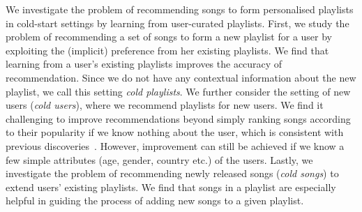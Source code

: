 %
We investigate the problem of recommending songs to form personalised playlists %
in cold-start settings by learning from user-curated playlists.
%
%
First, we study the problem of recommending a set of songs to form a new playlist for a user
by exploiting the (implicit) preference %
from her existing playlists.
We find that learning from a user's existing playlists %
improves the accuracy of recommendation.
Since we do not have any contextual information about the new playlist, 
we call this setting \emph{cold playlists}.
%
We further consider the setting of new users (\ie \emph{cold users}),
where we recommend playlists for new users.
We find it challenging to improve recommendations beyond simply ranking songs according to their popularity 
if we know nothing about the user, which is consistent with previous 
discoveries~\cite{mcfee2012million,bonnin2013evaluating,bonnin2015automated}.
However, improvement can still be achieved if we know a few simple attributes (\eg age, gender, country etc.)
of the users.
%
%
%
Lastly, we investigate the problem of recommending newly released songs (\ie \emph{cold songs}) to extend users' existing playlists. 
We find that songs in a playlist are especially helpful in guiding the process of adding new songs to a given playlist.



